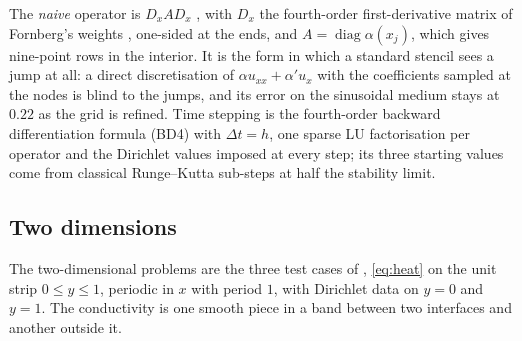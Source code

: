 \documentclass[11pt]{amsart}
\theoremstyle{definition}
\theoremstyle{remark}
\begin{document}
The \emph{naive} operator is $D_x A D_x$ \cite[eq.~(76)]{Martin2016}, with
$D_x$ the fourth-order first-derivative matrix of Fornberg's weights
\cite{Fornberg1988}, one-sided at the ends, and $A = \operatorname{diag}
\alpha(x_j)$, which gives nine-point rows in the interior. It is the form in
which a standard stencil sees a jump at all: a direct discretisation of
$\alpha u_{xx} + \alpha' u_x$ with the coefficients sampled at the nodes is
blind to the jumps, and its error on the sinusoidal medium stays at $0.22$
as the grid is refined. Time stepping is the fourth-order backward
differentiation formula (BD4) with $\Delta t = h$, one sparse LU
factorisation per operator and the Dirichlet values imposed at every step;
its three starting values come from classical Runge--Kutta sub-steps at half
the stability limit.

\subsection{Two dimensions}
\label{sec:setting2d}
The two-dimensional problems are the three test cases of
\cite{MartinFornberg2017heat}, \eqref{eq:heat} on the unit strip $0 \le y \le 1$, periodic in $x$ with
period $1$, with Dirichlet data on $y = 0$ and $y = 1$. The conductivity is
one smooth piece in a band between two interfaces and another outside it.
\end{document}
